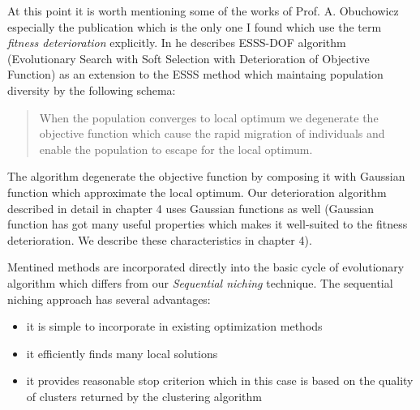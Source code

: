 At this point it is worth mentioning some of the works of Prof. A. Obuchowicz 
especially the publication \cite{esss} which is the only one I found which 
use the term \textit{fitness deterioration} explicitly.
In \cite{esss} he describes ESSS-DOF algorithm (Evolutionary Search with Soft
Selection with Deterioration of Objective Function) as an extension to the ESSS
method which maintaing population diversity by the following schema:
\begin{quotation}
When the population converges to local optimum we degenerate the objective 
function which cause the rapid migration of individuals and enable the 
population to escape for the local optimum.
\end{quotation}

The algorithm degenerate the objective function by composing it with Gaussian
function which approximate the local optimum. Our deterioration algorithm
described in detail in chapter 4 uses Gaussian functions as well
(Gaussian function has got many useful properties which makes it well-suited
to the fitness deterioration. We describe these characteristics in chapter 4).

Mentined methods are incorporated directly into the basic cycle of evolutionary
algorithm which differs from our \textit{Sequential niching} technique. 
The sequential niching approach has several advantages:

\begin{itemize}
  \item it is simple to incorporate in existing optimization methods
  \item it efficiently finds many local solutions
  \item it provides reasonable stop criterion which in this case is based on the
  quality of clusters returned by the clustering algorithm
\end{itemize}


